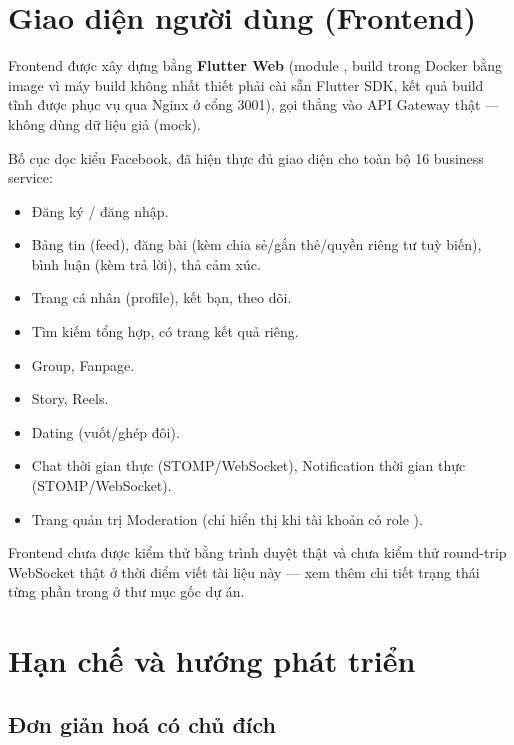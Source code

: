 \documentclass[12pt,a4paper]{report}
\begin{document}
\chapter{Giao diện người dùng (Frontend)}

Frontend được xây dựng bằng \textbf{Flutter Web} (module ,
build trong Docker bằng image  vì máy
build không nhất thiết phải cài sẵn Flutter SDK, kết quả build tĩnh được phục
vụ qua Nginx ở cổng 3001), gọi thẳng vào API Gateway thật — không dùng dữ liệu
giả (mock).

Bố cục dọc kiểu Facebook, đã hiện thực đủ giao diện cho toàn bộ 16 business
service:

\begin{itemize}[nosep]
    \item Đăng ký / đăng nhập.
    \item Bảng tin (feed), đăng bài (kèm chia sẻ/gắn thẻ/quyền riêng tư tuỳ
    biến), bình luận (kèm trả lời), thả cảm xúc.
    \item Trang cá nhân (profile), kết bạn, theo dõi.
    \item Tìm kiếm tổng hợp, có trang kết quả riêng.
    \item Group, Fanpage.
    \item Story, Reels.
    \item Dating (vuốt/ghép đôi).
    \item Chat thời gian thực (STOMP/WebSocket), Notification thời gian thực
    (STOMP/WebSocket).
    \item Trang quản trị Moderation (chỉ hiển thị khi tài khoản có role
    ).
\end{itemize}

Frontend chưa được kiểm thử bằng trình duyệt thật và chưa kiểm thử round-trip
WebSocket thật ở thời điểm viết tài liệu này — xem thêm chi tiết trạng thái
từng phần trong  ở thư mục gốc dự án.

\chapter{Hạn chế và hướng phát triển}
\label{ch:limitations}

\section{Đơn giản hoá có chủ đích}
\end{document}
